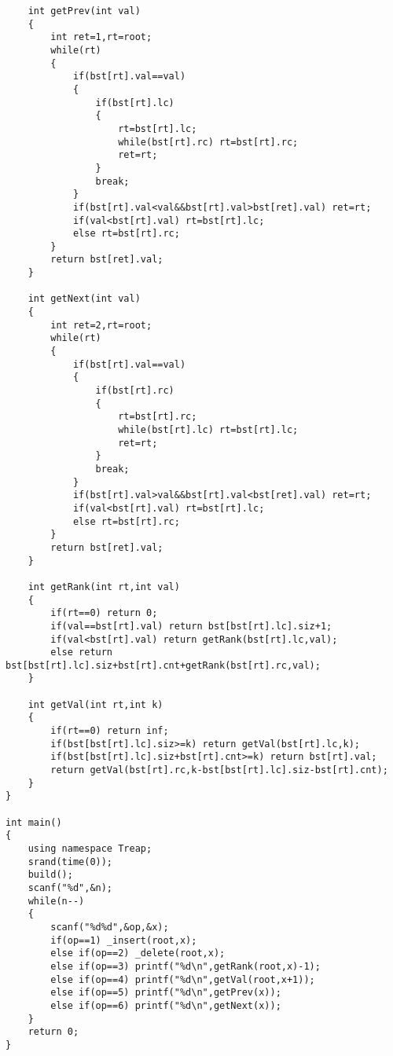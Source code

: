 \begin{lstlisting}
    int getPrev(int val)
    {
        int ret=1,rt=root;
        while(rt)
        {
            if(bst[rt].val==val)
            {
                if(bst[rt].lc)
                {
                    rt=bst[rt].lc;
                    while(bst[rt].rc) rt=bst[rt].rc;
                    ret=rt;
                }
                break;
            }
            if(bst[rt].val<val&&bst[rt].val>bst[ret].val) ret=rt;
            if(val<bst[rt].val) rt=bst[rt].lc;
            else rt=bst[rt].rc;
        }
        return bst[ret].val;
    }

    int getNext(int val)
    {
        int ret=2,rt=root;
        while(rt)
        {
            if(bst[rt].val==val)
            {
                if(bst[rt].rc)
                {
                    rt=bst[rt].rc;
                    while(bst[rt].lc) rt=bst[rt].lc;
                    ret=rt;
                }
                break;
            }
            if(bst[rt].val>val&&bst[rt].val<bst[ret].val) ret=rt;
            if(val<bst[rt].val) rt=bst[rt].lc;
            else rt=bst[rt].rc;
        }
        return bst[ret].val;
    }

    int getRank(int rt,int val)
    {
        if(rt==0) return 0;
        if(val==bst[rt].val) return bst[bst[rt].lc].siz+1;
        if(val<bst[rt].val) return getRank(bst[rt].lc,val);
        else return bst[bst[rt].lc].siz+bst[rt].cnt+getRank(bst[rt].rc,val);
    }

    int getVal(int rt,int k)
    {
        if(rt==0) return inf;
        if(bst[bst[rt].lc].siz>=k) return getVal(bst[rt].lc,k);
        if(bst[bst[rt].lc].siz+bst[rt].cnt>=k) return bst[rt].val;
        return getVal(bst[rt].rc,k-bst[bst[rt].lc].siz-bst[rt].cnt);
    }
}

int main()
{
    using namespace Treap;
    srand(time(0));
    build();
    scanf("%d",&n);
    while(n--)
    {
        scanf("%d%d",&op,&x);
        if(op==1) _insert(root,x);
        else if(op==2) _delete(root,x);
        else if(op==3) printf("%d\n",getRank(root,x)-1);
        else if(op==4) printf("%d\n",getVal(root,x+1));
        else if(op==5) printf("%d\n",getPrev(x));
        else if(op==6) printf("%d\n",getNext(x));
    }
    return 0;
}
\end{lstlisting}